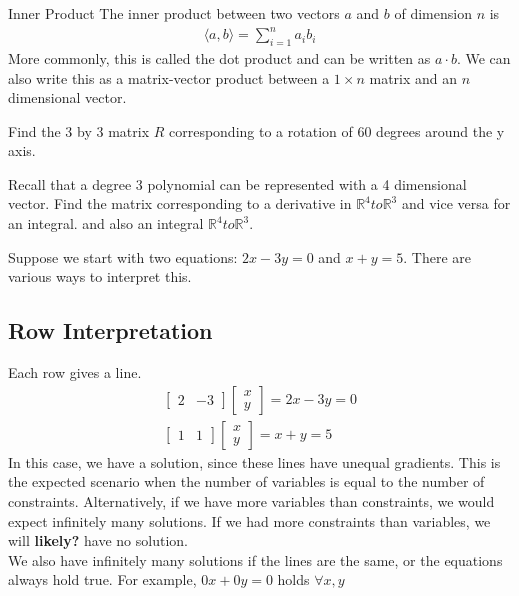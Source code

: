 \documentclass[11pt]{article}
\begin{document}
\begin{definitionbox}{Inner Product}
    The inner product between two vectors $a$ and $b$ of dimension $n$ is
    \begin{align*}
        \langle a, b \rangle = \sum_{i=1}^{n} a_i b_i
    \end{align*}
    More commonly, this is called the dot product and can be written as $a \cdot b$. We can also write this as a matrix-vector product between a $1 \times n$ matrix and an $n$ dimensional vector. 
\end{definitionbox}

\begin{examplebox}{}
    Find the 3 by 3 matrix $R$ corresponding to a rotation of $60$ degrees around the y axis.
\end{examplebox}

\begin{examplebox}{}
    Recall that a degree 3 polynomial can be represented with a 4 dimensional vector. Find the matrix
    corresponding to a derivative in $\mathbb{R}^4 to \mathbb{R}^3$ and vice versa for an integral. and also an integral $\mathbb{R}^4 to \mathbb{R}^3$. 
\end{examplebox}

Suppose we start with two equations: $2x-3y=0$ and $x+y=5$. There are various ways to interpret this.

\subsection{Row Interpretation}
Each row gives a line.
\begin{align*}
    \begin{bmatrix}
        2 & -3
    \end{bmatrix}
    \begin{bmatrix}
        x \\
        y
    \end{bmatrix}
    =
    2x-3y=0 \\
    \begin{bmatrix}
        1 & 1
    \end{bmatrix}
    \begin{bmatrix}
        x \\
        y
    \end{bmatrix}
    =
    x + y = 5
\end{align*}
In this case, we have a solution, since these lines have unequal gradients. This is the expected scenario when the number of variables is equal to the number of constraints. Alternatively, if we have more variables than constraints, we would expect infinitely many solutions. If we had more constraints than variables, we will \textbf{likely?} have no solution. \\
We also have infinitely many solutions if the lines are the same, or the equations always hold true. For example, $0x+0y=0$ holds $\forall x, y$
\end{document}
